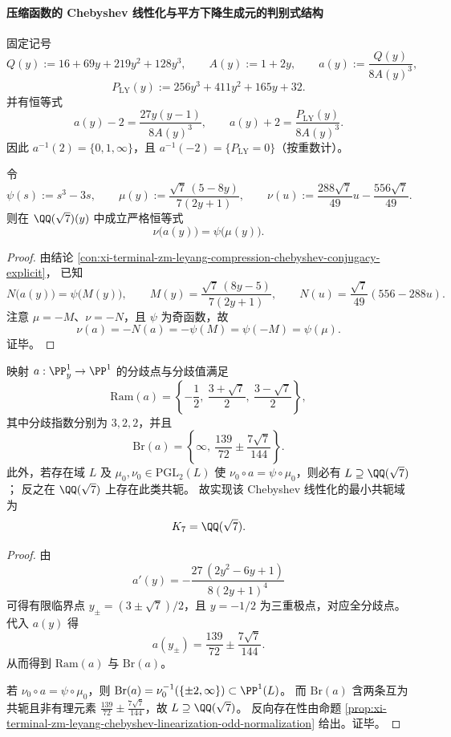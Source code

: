 \paragraph{压缩函数的 Chebyshev 线性化与平方下降生成元的判别式结构}\label{par:xi-terminal-zm-leyang-chebyshev-square-descent-index283}
固定记号
\[
Q(y):=16+69y+219y^2+128y^3,\qquad
A(y):=1+2y,\qquad
a(y):=\frac{Q(y)}{8A(y)^3},
\]
\[
P_{\mathrm{LY}}(y):=256y^3+411y^2+165y+32.
\]
并有恒等式
\[
a(y)-2=\frac{27y(y-1)}{8A(y)^3},\qquad
a(y)+2=\frac{P_{\mathrm{LY}}(y)}{8A(y)^3}.
\]
因此
\(
a^{-1}(2)=\{0,1,\infty\}
\)，且
\(
a^{-1}(-2)=\{P_{\mathrm{LY}}=0\}
\)（按重数计）。

\begin{proposition}\label{prop:xi-terminal-zm-leyang-chebyshev-linearization-odd-normalization}
令
\[
\psi(s):=s^3-3s,
\qquad
\mu(y):=\frac{\sqrt7\,(5-8y)}{7(2y+1)},
\qquad
\nu(u):=\frac{288\sqrt7}{49}u-\frac{556\sqrt7}{49}.
\]
则在 \(\QQ(\sqrt7)(y)\) 中成立严格恒等式
\[
\nu\!\bigl(a(y)\bigr)=\psi\!\bigl(\mu(y)\bigr).
\]
\end{proposition}

\begin{proof}
由结论 \ref{con:xi-terminal-zm-leyang-compression-chebyshev-conjugacy-explicit}，
已知
\[
N\!\bigl(a(y)\bigr)=\psi\!\bigl(M(y)\bigr),\qquad
M(y)=\frac{\sqrt7\,(8y-5)}{7(2y+1)},\qquad
N(u)=\frac{\sqrt7}{49}(556-288u).
\]
注意 \(\mu=-M\)、\(\nu=-N\)，且 \(\psi\) 为奇函数，故
\[
\nu(a)= -N(a)= -\psi(M)=\psi(-M)=\psi(\mu).
\]
证毕。
\end{proof}

\begin{theorem}[分歧值域的二次指纹与最小共轭域]\label{thm:xi-terminal-zm-leyang-chebyshev-branch-quadratic-fingerprint}
映射 \(a:\PP^1_y\to\PP^1\) 的分歧点与分歧值满足
\[
\mathrm{Ram}(a)=\left\{-\frac12,\ \frac{3+\sqrt7}{2},\ \frac{3-\sqrt7}{2}\right\},
\]
其中分歧指数分别为 \(3,2,2\)，并且
\[
\mathrm{Br}(a)=\left\{\infty,\ \frac{139}{72}\pm\frac{7\sqrt7}{144}\right\}.
\]
此外，若存在域 \(L\) 及 \(\mu_0,\nu_0\in\mathrm{PGL}_2(L)\) 使
\(
\nu_0\circ a=\psi\circ\mu_0
\)，则必有 \(L\supseteq \QQ(\sqrt7)\)；
反之在 \(\QQ(\sqrt7)\) 上存在此类共轭。
故实现该 Chebyshev 线性化的最小共轭域为
\[
K_7=\QQ(\sqrt7).
\]
\end{theorem}

\begin{proof}
由
\[
a'(y)=-\frac{27\,(2y^2-6y+1)}{8(2y+1)^4}
\]
可得有限临界点 \(y_\pm=(3\pm\sqrt7)/2\)，且 \(y=-1/2\) 为三重极点，对应全分歧点。
代入 \(a(y)\) 得
\[
a(y_\pm)=\frac{139}{72}\pm\frac{7\sqrt7}{144}.
\]
从而得到 \(\mathrm{Ram}(a)\) 与 \(\mathrm{Br}(a)\)。

若 \(\nu_0\circ a=\psi\circ\mu_0\)，则
\(
\mathrm{Br}(a)=\nu_0^{-1}(\{\pm2,\infty\})\subset\PP^1(L)
\)。
而 \(\mathrm{Br}(a)\) 含两条互为共轭且非有理元素
\(
\frac{139}{72}\pm\frac{7\sqrt7}{144}
\)，故 \(L\supseteq\QQ(\sqrt7)\)。
反向存在性由命题 \ref{prop:xi-terminal-zm-leyang-chebyshev-linearization-odd-normalization} 给出。证毕。
\end{proof}

